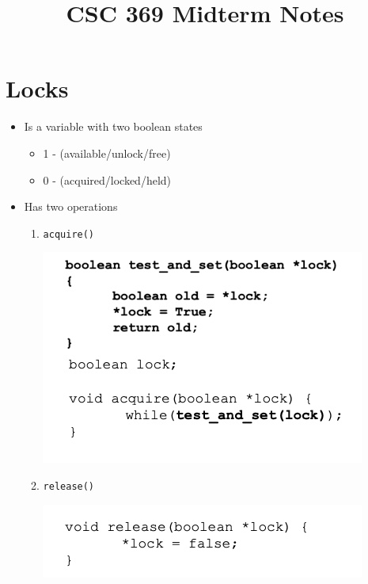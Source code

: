 \documentclass[12pt]{article}
\begin{document}
\title{CSC 369 Midterm Notes}

\bigskip

\section*{Locks}

\begin{itemize}
    \item Is a variable with two boolean states

    \begin{itemize}
        \item 1 - (available/unlock/free)
        \item 0 - (acquired/locked/held)
    \end{itemize}

    \item Has two operations

    \begin{enumerate}[1.]
        \item \texttt{acquire()}

        \bigskip

        \begin{center}
        \includegraphics[width=0.7\linewidth]{images/midterm_1_solution_4.png}
        \end{center}

        \bigskip

        \item \texttt{release()}

        \bigskip

        \begin{center}
        \includegraphics[width=0.7\linewidth]{images/midterm_1_solution_5.png}
        \end{center}


\end{enumerate}
\end{itemize}
\end{document}
